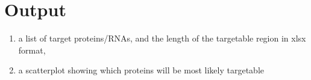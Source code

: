 \documentclass{article}
\begin{document}
\section{Output}

\begin{enumerate}
%    
    \item a list of target proteins/RNAs, and the length of the targetable region in xlsx format,
    \item a scatterplot showing which proteins will be most likely targetable
\end{enumerate}
\end{document}
